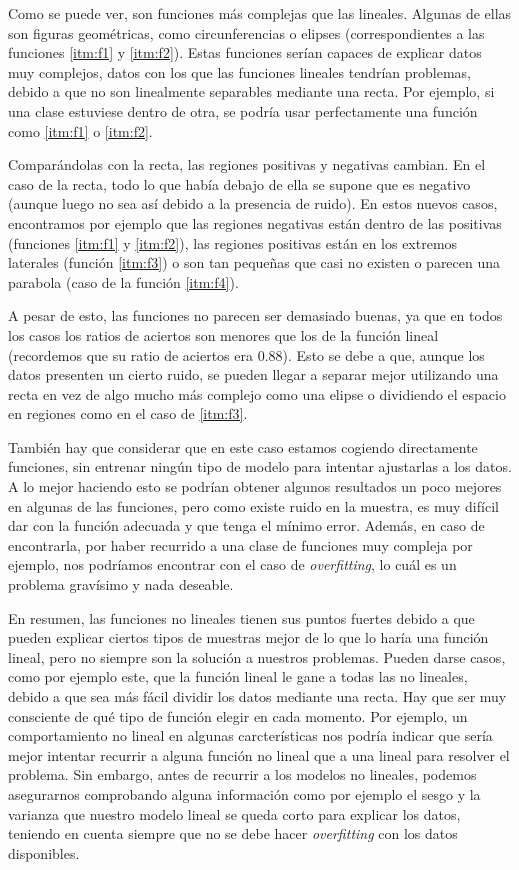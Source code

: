 \documentclass[11pt,a4paper]{article}
\begin{document}
Como se puede ver, son funciones más complejas que las lineales. Algunas de ellas son figuras
geométricas, como circunferencias o elipses (correspondientes a las funciones \ref{itm:f1} y
\ref{itm:f2}). Estas funciones serían capaces de explicar datos muy complejos, datos con los que
las funciones lineales tendrían problemas, debido a que no son linealmente separables mediante
una recta. Por ejemplo, si una clase estuviese dentro de otra, se podría usar perfectamente una
función como \ref{itm:f1} o \ref{itm:f2}.

Comparándolas con la recta, las regiones positivas y negativas cambian. En el caso de la recta, todo
lo que había debajo de ella se supone que es negativo (aunque luego no sea así debido a la presencia
de ruido). En estos nuevos casos, encontramos por ejemplo que las regiones negativas están dentro
de las positivas (funciones \ref{itm:f1} y  \ref{itm:f2}), las regiones positivas están en los
extremos laterales (función \ref{itm:f3}) o son tan pequeñas que casi no existen o parecen una
parabola (caso de la función \ref{itm:f4}).

A pesar de esto, las funciones no parecen ser demasiado buenas, ya que en todos los casos los ratios
de aciertos son menores que los de la función lineal (recordemos que su ratio de aciertos era
$0.88$). Esto se debe a que, aunque los datos presenten un cierto ruido, se pueden llegar a separar
mejor utilizando una recta en vez de algo mucho más complejo como una elipse o dividiendo el espacio
en regiones como en el caso de \ref{itm:f3}.

También hay que considerar que en este caso estamos cogiendo directamente funciones, sin entrenar
ningún tipo de modelo para intentar ajustarlas a los datos. A lo mejor haciendo esto se podrían
obtener algunos resultados un poco mejores en algunas de las funciones, pero como existe ruido en la
muestra, es muy difícil dar con la función adecuada y que tenga el mínimo error. Además, en caso de
encontrarla, por haber recurrido a una clase de funciones muy compleja por ejemplo, nos podríamos
encontrar con el caso de \textit{overfitting}, lo cuál es un problema gravísimo y nada deseable.

En resumen, las funciones no lineales tienen sus puntos fuertes debido a que pueden explicar ciertos
tipos de muestras mejor de lo que lo haría una función lineal, pero no siempre son la solución a
nuestros problemas. Pueden darse casos, como por ejemplo este, que la función lineal le gane a todas
las no lineales, debido a que sea más fácil dividir los datos mediante una recta. Hay que ser muy
consciente de qué tipo de función elegir en cada momento. Por ejemplo, un comportamiento no lineal en
algunas carcterísticas nos podría indicar que sería mejor intentar recurrir a alguna función no lineal
que a una lineal para resolver el problema. Sin embargo, antes de recurrir a los modelos no lineales,
podemos asegurarnos comprobando alguna información como por ejemplo el sesgo y la varianza que nuestro
modelo lineal se queda corto para explicar los datos, teniendo en cuenta siempre que no se debe hacer
\textit{overfitting} con los datos disponibles.
\end{document}
